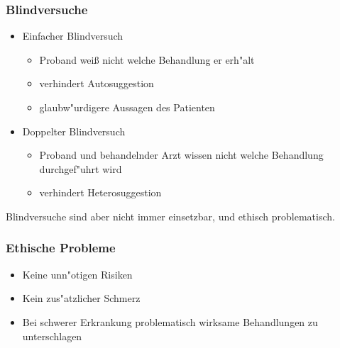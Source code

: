 \documentclass{beamer}
\begin{document}
\begin{frame}
  \frametitle{Blindversuche}
  \begin{itemize}[<+->]
    \item Einfacher Blindversuch
      \begin{itemize}[<+->]
        \item Proband wei{\ss}  nicht welche Behandlung er erh"alt
        \item verhindert Autosuggestion
        \item glaubw"urdigere Aussagen des Patienten
      \end{itemize}
    \item Doppelter Blindversuch
      \begin{itemize}[<+->]
        \item Proband und behandelnder Arzt wissen nicht welche Behandlung durchgef"uhrt wird
        \item verhindert Heterosuggestion
      \end{itemize}
  \end{itemize}
  \pause
  Blindversuche sind aber nicht immer einsetzbar, und ethisch problematisch.
\end{frame}

\begin{frame}
  \frametitle{Ethische Probleme}
  \begin{itemize}[<+->]
    \item Keine unn"otigen Risiken
    \item Kein zus"atzlicher Schmerz
    \item Bei schwerer Erkrankung problematisch wirksame Behandlungen zu unterschlagen
  \end{itemize}
\end{frame}
\end{document}
